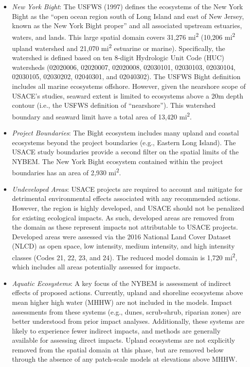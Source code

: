 \documentclass[
]{book}
\begin{document}
\begin{itemize}
\item
  \emph{New York Bight}: The USFWS (1997) defines the ecosystems of the New York Bight as the ``open ocean region south of Long Island and east of New Jersey, known as the New York Bight proper'' and all associated upstream estuaries, waters, and lands. This large spatial domain covers 31,276 mi\textsuperscript{2} (10,206 mi\textsuperscript{2} upland watershed and 21,070 mi\textsuperscript{2} estuarine or marine). Specifically, the watershed is defined based on ten 8-digit Hydrologic Unit Code (HUC) watersheds (02020006, 02020007, 02020008, 02030101, 02030103, 02030104, 02030105, 02030202, 02040301, and 02040302). The USFWS Bight definition includes all marine ecosystems offshore. However, given the nearshore scope of USACE's studies, seaward extent is limited to ecosystems above a 20m depth contour (i.e., the USFWS definition of ``nearshore''). This watershed boundary and seaward limit have a total area of 13,420 mi\textsuperscript{2}.
\item
  \emph{Project Boundaries}: The Bight ecosystem includes many upland and coastal ecosystems beyond the project boundaries (e.g., Eastern Long Island). The USACE study boundaries provide a second filter on the spatial limits of the NYBEM. The New York Bight ecosystem contained within the project boundaries has an area of 2,930 mi\textsuperscript{2}.
\item
  \emph{Undeveloped Areas}: USACE projects are required to account and mitigate for detrimental environmental effects associated with any recommended actions. However, the region is highly developed, and USACE should not be penalized for existing ecological impacts. As such, developed areas are removed from the domain as these represent impacts not attributable to USACE projects. Developed areas were assessed via the 2016 National Land Cover Dataset (NLCD) as open space, low intensity, medium intensity, and high intensity classes (Codes 21, 22, 23, and 24). The reduced model domain is 1,720 mi\textsuperscript{2}, which includes all areas potentially assessed for impacts.
\item
  \emph{Aquatic Ecosystems}: A key focus of the NYBEM is assessment of indirect effects of proposed actions. Currently, upland and shoreline ecosystems above mean higher high water (MHHW) are not included in the models. Impact assessments from these systems (e.g., dunes, scrub-shrub, riparian zones) are better understood from prior impact analyses. Additionally, these systems are likely to experience fewer indirect impacts, and methods are generally available for assessing direct impacts. Upland ecosystems are not explicitly removed from the spatial domain at this phase, but are removed below through the absence of any patch-scale models at elevations above MHHW.
\end{itemize}
\end{document}
